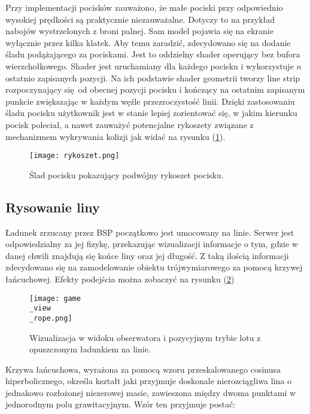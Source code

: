 Przy implementacji pocisków zauważono, że małe pociski przy odpowiednio wysokiej prędkości są praktycznie niezauważalne. Dotyczy to na przykład nabojów wystrzelonych z broni palnej. Sam model pojawia się na ekranie wyłącznie przez kilka klatek. Aby temu zaradzić, zdecydowano się na dodanie śladu podążającego za pociskami. Jest to oddzielny shader operujący bez bufora wierzchołkowego. Shader jest uruchamiany dla każdego pocisku i wykorzystuje $n$ ostatnio zapisanych pozycji. Na ich podstawie shader geometrii tworzy line strip rozpoczynający się od obecnej pozycji pocisku i kończący na ostatnim zapisanym punkcie zwiększając w każdym węźle przezroczystość linii. Dzięki zastosowaniu śladu pocisku użytkownik jest w stanie lepiej zorientować się, w jakim kierunku pocisk poleciał, a nawet zauważyć potencjalne rykoszety związane z mechanizmem wykrywania kolizji jak widać na rysunku (\ref{rykoszet}).

\begin{figure}[h]
	\centering
	\texttt{[image: rykoszet.png]}
	\caption{Ślad pocisku pokazujący podwójny rykoszet pocisku.}
	\label{rykoszet}
\end{figure}

\subsection{Rysowanie liny}

Ładunek zrzucany przez BSP początkowo jest umocowany na linie. Serwer jest odpowiedzialny za jej fizykę, przekazując wizualizacji informacje o tym, gdzie w danej chwili znajdują się końce liny oraz jej długość. Z taką ilością informacji zdecydowano się na zamodelowanie obiektu trójwymiarowego za pomocą krzywej łańcuchowej. Efekty podejścia można zobaczyć na rysunku (\ref{gui_game4})
\\

\begin{figure}[!h]
	\centering
	\texttt{[image: game\\\_view\\\_rope.png]}
	\caption{Wizualizacja w widoku obserwatora i pozycyjnym trybie lotu z opuszczonym ładunkiem na linie.}
	\label{gui_game4}
\end{figure}

Krzywa łańcuchowa, wyrażona za pomocą wzoru przeskalowanego cosinusa hiperbolicznego, określa kształt jaki przyjmuje doskonale nierozciągliwa lina o jednakowo rozłożonej niezerowej masie, zawieszona między dwoma punktami w jednorodnym polu grawitacyjnym. Wzór ten przyjmuje postać:

